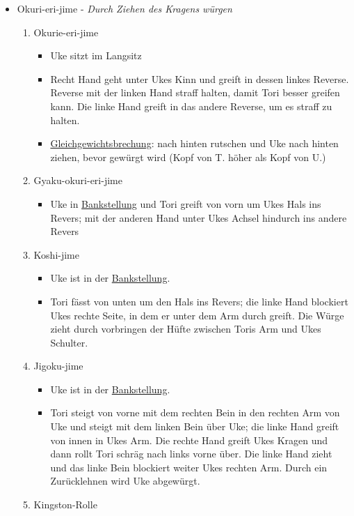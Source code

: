 \documentclass[justified, a4paper, notitlepage, captions=tableheading, nobib]{tufte-handout}
\begin{document}
\begin{itemize}
\item \label{orgb4ae64c}Okuri-eri-jime - \emph{Durch Ziehen des Kragens würgen}

\begin{enumerate}
\item \label{orgc066d0d}Okurie-eri-jime
\begin{itemize}
\item Uke sitzt im Langsitz
\item Recht Hand geht unter Ukes Kinn und greift in dessen linkes Reverse. Reverse mit der linken Hand straff halten, damit Tori besser greifen kann. Die  linke Hand greift in das andere Reverse, um es straff zu halten.
\item \hyperref[orgc1d00b8]{Gleichgewichtsbrechung}: nach hinten rutschen und Uke nach hinten ziehen, bevor gewürgt wird (Kopf von T. höher als Kopf von U.)
\end{itemize}
\item \label{org48bc774}Gyaku-okuri-eri-jime 
\begin{itemize}
\item Uke in \hyperref[orgd4877a8]{Bankstellung} und Tori greift von vorn um Ukes Hals ins Revers; mit der anderen Hand unter Ukes Achsel hindurch ins andere Revers
\end{itemize}
\item \label{org911829b}Koshi-jime 
\begin{itemize}
\item Uke ist in der \hyperref[orgd4877a8]{Bankstellung}.
\item Tori fässt von unten um den Hals ins Revers; die linke Hand blockiert Ukes rechte Seite, in dem er unter dem Arm durch greift. Die Würge zieht durch vorbringen der Hüfte zwischen Toris Arm und Ukes Schulter.
\end{itemize}
\item \label{org8c6610c}Jigoku-jime 
\begin{itemize}
\item Uke ist in der \hyperref[orgd4877a8]{Bankstellung}.
\item Tori steigt von vorne mit dem rechten Bein in den rechten Arm von Uke und steigt mit dem linken Bein über Uke; die linke Hand greift von innen in Ukes Arm. Die rechte Hand greift Ukes Kragen und dann rollt Tori schräg nach links vorne über. Die linke Hand zieht und das linke Bein blockiert weiter Ukes rechten Arm. Durch ein Zurücklehnen wird Uke abgewürgt.
\end{itemize}
\item \label{org097c9f2}Kingston-Rolle 

\end{enumerate}
\end{itemize}
\end{document}

